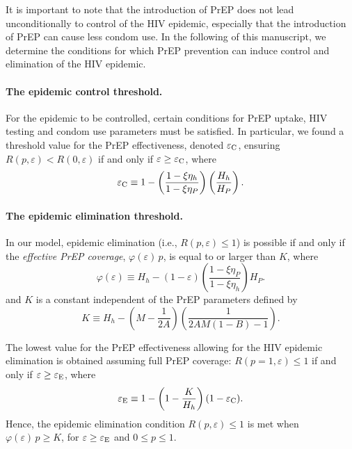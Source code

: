 \documentclass[11pt]{article}
\begin{document}
It is important to note that the introduction of PrEP does not lead unconditionally to control of the HIV epidemic, especially that the introduction of PrEP can cause less condom use. In the following of this manuscript, we determine the conditions for which PrEP prevention can induce control and elimination of the HIV epidemic.


\paragraph{The epidemic control threshold.} 

For the epidemic to be controlled, certain conditions for PrEP uptake, HIV testing and condom use parameters must be satisfied. In particular, we found a threshold value for the PrEP effectiveness, denoted $\varepsilon_{\rm C}$, ensuring $R(p,\varepsilon) < R(0,\varepsilon)$ if and only if $\varepsilon \geq \varepsilon_{\rm C}$, where
\begin{equation}
	\varepsilon_{\rm C}\equiv 1 - \left( \frac{1-\xi \eta_h}{1-\xi \eta_P}\right) \left(\frac{H_h}{H_P}\right).
\end{equation}


\paragraph{The epidemic elimination threshold.} 

In our model, epidemic elimination (i.e., $R(p,\varepsilon) \leq 1$) is possible if and only if the {\it effective PrEP coverage}, $\varphi(\varepsilon) \, p$, is equal to or larger than $K$, where 
\begin{equation}
	\varphi(\varepsilon) \equiv H_h - (1-\varepsilon) \left( \frac{1-\xi \eta_P}{1-\xi \eta_h}\right) H_P.
\end{equation} 
and $K$ is a constant independent of the PrEP parameters defined by
\begin{equation}
	K \equiv H_h - \left(M - \frac{1}{2A}\right) \left(\frac{1}{2AM (1-B) -1}\right).
\end{equation}

The lowest value for the PrEP effectiveness allowing for the HIV epidemic elimination is obtained assuming full PrEP coverage: $R(p=1,\varepsilon) \leq 1$ if and only if $\varepsilon\geq\varepsilon_{\rm E}$, where
\begin{equation}
	\varepsilon_{\rm E} \equiv 1- \left( 1- \frac{K}{H_h}\right) (1-\varepsilon_{\rm C}).
\end{equation}
Hence, the epidemic elimination condition $R(p,\varepsilon) \leq 1$ is met when $\varphi(\varepsilon) \, p \geq K$, for  $\varepsilon\geq\varepsilon_{\rm E}$ and $0\leq p\leq 1$.
\end{document}
